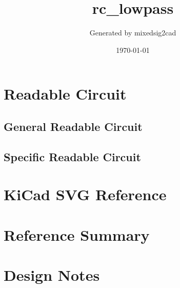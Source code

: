 \documentclass[11pt]{article}
\title{rc\_lowpass}
\author{Generated by mixedsig2cad}
\date{\today}
\begin{document}
\maketitle
\section{Readable Circuit}
\subsection{General Readable Circuit}

\subsection{Specific Readable Circuit}

\section{KiCad SVG Reference}
\section{Reference Summary}

\section{Design Notes}

\end{document}
